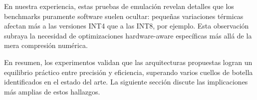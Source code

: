 En nuestra experiencia, estas pruebas de emulación revelan detalles que los benchmarks puramente software suelen ocultar: pequeñas variaciones térmicas afectan más a las versiones INT4 que a las INT8, por ejemplo. Esta observación subraya la necesidad de optimizaciones hardware-aware específicas más allá de la mera compresión numérica.

En resumen, los experimentos validan que las arquitecturas propuestas logran un equilibrio práctico entre precisión y eficiencia, superando varios cuellos de botella identificados en el estado del arte. La siguiente sección discute las implicaciones más amplias de estos hallazgos.